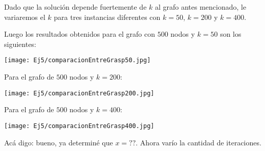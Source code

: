 Dado que la solución depende fuertemente de $k$ al grafo antes mencionado, le variaremos el $k$ para tres instancias diferentes con $k = 50$, $k = 200$ y $k = 400$.

Luego los resultados obtenidos para el grafo con $500$ nodos y $k = 50$ son los siguientes:

\texttt{[image: Ej5/comparacionEntreGrasp50.jpg]}

Para el grafo de $500$ nodos y $k = 200$:

\texttt{[image: Ej5/comparacionEntreGrasp200.jpg]}


Para el grafo de $500$ nodos y $k = 400$:

\texttt{[image: Ej5/comparacionEntreGrasp400.jpg]}

Acá digo: bueno, ya determiné que $x = ??$. Ahora varío la cantidad de iteraciones.